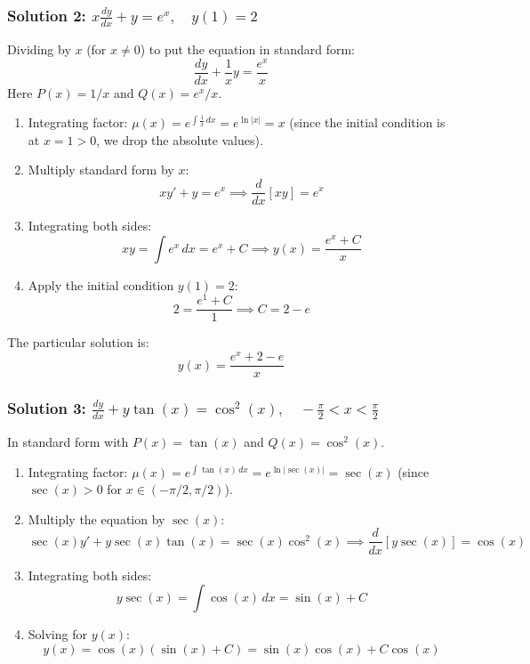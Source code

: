 \documentclass[11pt,letterpaper]{article}
\begin{document}
\subsubsection*{Solution 2: $x\frac{dy}{dx} + y = e^x, \quad y(1) = 2$}
Dividing by $x$ (for $x \neq 0$) to put the equation in standard form:
\[ \frac{dy}{dx} + \frac{1}{x}y = \frac{e^x}{x} \]
Here $P(x) = 1/x$ and $Q(x) = e^x/x$.
\begin{enumerate}
    \item Integrating factor: $\mu(x) = e^{\int \frac{1}{x} \, dx} = e^{\ln|x|} = x$ (since the initial condition is at $x=1 > 0$, we drop the absolute values).
    \item Multiply standard form by $x$:
    \[ x y' + y = e^x \implies \frac{d}{dx}[xy] = e^x \]
    \item Integrating both sides:
    \[ xy = \int e^x \, dx = e^x + C \implies y(x) = \frac{e^x + C}{x} \]
    \item Apply the initial condition $y(1) = 2$:
    \[ 2 = \frac{e^1 + C}{1} \implies C = 2 - e \]
\end{enumerate}
The particular solution is:
\[ y(x) = \frac{e^x + 2 - e}{x} \]

\subsubsection*{Solution 3: $\frac{dy}{dx} + y \tan(x) = \cos^2(x), \quad -\frac{\pi}{2} < x < \frac{\pi}{2}$}
In standard form with $P(x) = \tan(x)$ and $Q(x) = \cos^2(x)$.
\begin{enumerate}
    \item Integrating factor: $\mu(x) = e^{\int \tan(x) \, dx} = e^{\ln|\sec(x)|} = \sec(x)$ (since $\sec(x) > 0$ for $x \in (-\pi/2, \pi/2)$).
    \item Multiply the equation by $\sec(x)$:
    \[ \sec(x) y' + y \sec(x)\tan(x) = \sec(x)\cos^2(x) \implies \frac{d}{dx}\left[ y \sec(x) \right] = \cos(x) \]
    \item Integrating both sides:
    \[ y \sec(x) = \int \cos(x) \, dx = \sin(x) + C \]
    \item Solving for $y(x)$:
    \[ y(x) = \cos(x)(\sin(x) + C) = \sin(x)\cos(x) + C \cos(x) \]
\end{enumerate}
\end{document}
